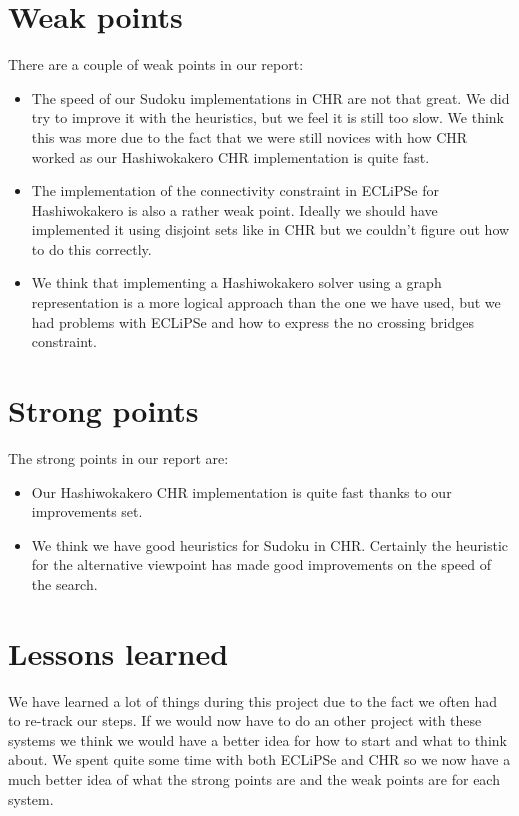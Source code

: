 \documentclass{report}
\begin{document}
\section{Weak points}
There are a couple of weak points in our report:
\begin{itemize}
    \item The speed of our Sudoku implementations in CHR are not that great. We did try to improve it with the heuristics, but we feel it is still too slow. We think this was more due to the fact that we were still novices with how CHR worked as our Hashiwokakero CHR implementation is quite fast.
    \item The implementation of the connectivity constraint in ECLiPSe for Hashiwokakero is also a rather weak point. Ideally we should have implemented it using disjoint sets like in CHR but we couldn't figure out how to do this correctly.
    \item We think that implementing a Hashiwokakero solver using a graph representation is a more logical approach than the one we have used, but we had problems with ECLiPSe and how to express the no crossing bridges constraint.
\end{itemize}
\section{Strong points}
The strong points in our report are:
\begin{itemize}
    \item Our Hashiwokakero CHR implementation is quite fast thanks to our improvements set.
    \item We think we have good heuristics for Sudoku in CHR. Certainly the heuristic for the alternative viewpoint has made good improvements on the speed of the search.
\end{itemize}

\section{Lessons learned}
We have learned a lot of things during this project due to the fact we often had to re-track our steps. If we would now have to do an other project with these systems we think we would have a better idea for how to start and what to think about. We spent quite some time with both ECLiPSe and CHR so we now have a much better idea of what the strong points are and the weak points are for each system.
\end{document}
